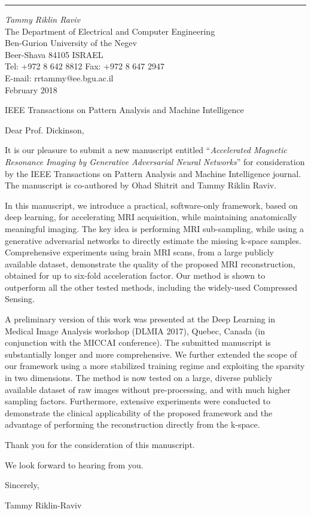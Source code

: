 \documentclass[12pt]{article}
\begin{document}
\thispagestyle{empty}


\sloppy

\vskip0.3cm
\hrule width11.5cm height1pt %
\vskip0.1cm
{\it Tammy Riklin Raviv}\\[0.05cm]
{\small The Department of Electrical and Computer Engineering} \\[0.07cm]
{\small Ben-Gurion University of the Negev} \\
{\small Beer-Shava 84105 {\hskip6pt} ISRAEL}\\[0.1cm]
{\scriptsize Tel: +972 8 642 8812}\hspace{8pt}
               {\scriptsize Fax: +972 8 647 2947}\\
{\scriptsize E-mail: \hspace{1pt} rrtammy@ee.bgu.ac.il}\\

\vspace{-0.7cm}
\hfill February 2018


IEEE Transactions on Pattern Analysis and Machine Intelligence
\vspace{0.2cm}

Dear Prof. Dickinson, 


\vspace{0.2cm}

It is our pleasure to submit a new manuscript entitled  ``{\it Accelerated Magnetic Resonance Imaging by Generative Adversarial Neural Networks}'' for
consideration by the IEEE Transactions on Pattern Analysis and Machine Intelligence journal. 
The manuscript is co-authored by Ohad Shitrit and Tammy Riklin Raviv.

In this manuscript, we introduce a practical, software-only framework, based on deep learning, for accelerating MRI acquisition, while maintaining anatomically meaningful imaging. The key idea is performing MRI sub-sampling, while using a generative adversarial networks to directly estimate the missing k-space samples.
Comprehensive experiments using brain MRI scans, from a large publicly available dataset, demonstrate the quality of the proposed MRI reconstruction, obtained for up to six-fold acceleration factor. 
Our method is shown to outperform all the other tested methods, including the widely-used Compressed Sensing.


A preliminary version of this work was presented at the Deep Learning in Medical Image Analysis workshop (DLMIA 2017), Quebec, Canada
(in conjunction with the MICCAI conference). The submitted manuscript is substantially
longer and more comprehensive. We further extended the scope of our framework using a more stabilized training regime and exploiting the sparsity in two dimensions. The method is now tested on a large, diverse publicly available dataset of raw images without pre-processing, and with much higher sampling factors. Furthermore, extensive experiments were conducted to demonstrate the clinical applicability of the proposed framework and the advantage of performing the reconstruction directly from the k-space.

Thank you for the consideration of this manuscript. 

We look forward to hearing from you.

\vspace{1cm}


Sincerely,

\vspace{0.2cm}

Tammy Riklin-Raviv
\end{document}
